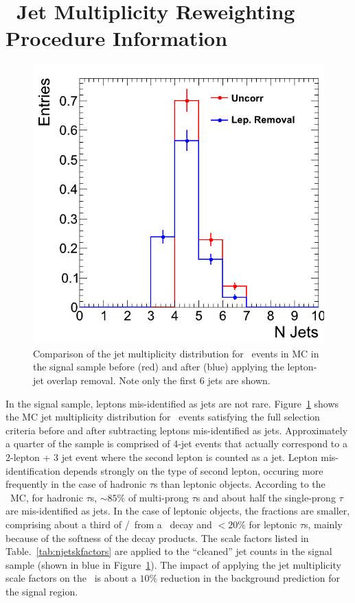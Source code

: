 
\section{\ttd\ Jet Multiplicity Reweighting Procedure Information}
\label{app:ttdlnj}


\begin{figure}[hbt]
  \begin{center}
	\includegraphics[width=0.5\linewidth]{plots/ttdl_njets_lepremoval_comp.png}
	\caption{
	  \label{fig:dileptonnjets_lepcomp}%
          Comparison of the jet multiplicity distribution for \ttll\
          events in MC in the signal sample before (red) and after
          (blue) applying the lepton-jet overlap removal. Note only
          the first 6 jets are shown.}  
      \end{center}
\end{figure}


In the signal sample, leptons mis-identified as jets are not rare. 
Figure~\ref{fig:dileptonnjets_lepcomp}  shows the MC jet
multiplicity distribution for \ttll\ events satisfying the full
selection criteria before and after subtracting leptons mis-identified
as jets. Approximately a quarter of the sample is comprised of 4-jet
events that actually correspond to a 2-lepton + 3 jet event where the second
lepton is counted as a jet. Lepton mis-identification depends strongly
on the type of second lepton, occuring more frequently in the case of
hadronic $\tau$s than leptonic objects. According to the \ttll\
MC, for hadronic $\tau$s, $\sim85\%$ of multi-prong $\tau$s and about half
the single-prong $\tau$ are mis-identified as jets. In the case of
leptonic objects, the fractions are smaller, comprising about a third
of \E/\M\ from a \W\ decay and $<20\%$ for leptonic $\tau$s, 
mainly because of the softness of the decay products. 
The scale factors listed in Table.~\ref{tab:njetskfactors} are applied
to the ``cleaned'' jet counts in the signal sample (shown in blue in
Figure~\ref{fig:dileptonnjets_lepcomp}). The impact of applying the
jet multiplicity scale factors on the \ttll\ is about a $10\%$ reduction in the
background prediction for the signal region. 


